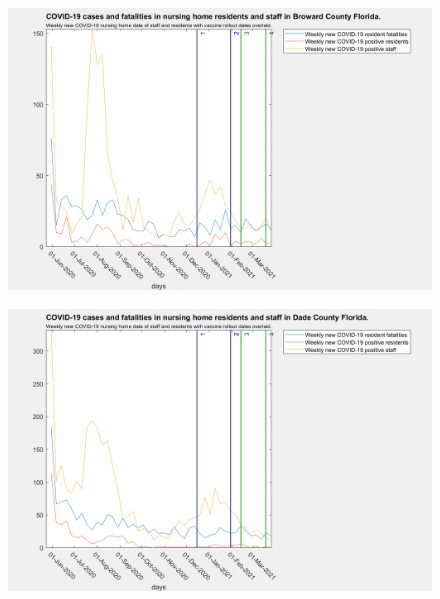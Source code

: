 \documentclass[twoside]{article}
\begin{document}
\begin{multicols}{2}
\begin{figure}[H]
	\includegraphics[width=\linewidth]{images/broward_nursing_home_with_vaccine.png}
	\caption{}
	\label{fig:images/broward_nursing_home_with_vaccineLabel}
\end{figure}

\begin{figure}[H]
	\includegraphics[width=\linewidth]{images/dade_nursing_home_with_vaccine.png}
	\caption{}
	\label{fig:images/dade_nursing_home_with_vaccineLabel}
\end{figure}


\end{multicols}
\end{document}
